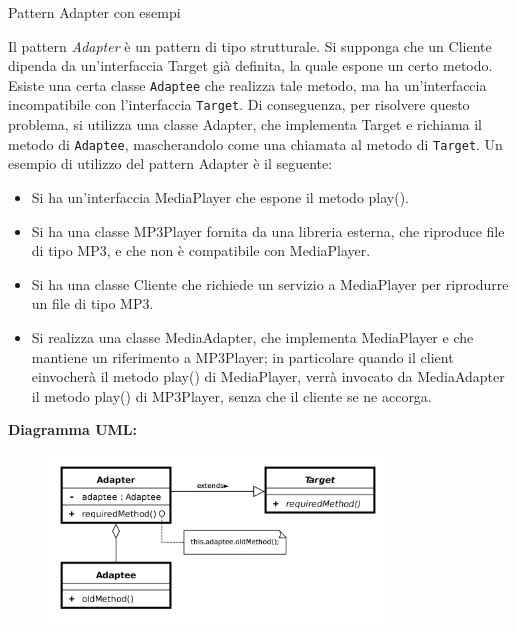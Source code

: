 \begin{problem}{1.20}
Pattern Adapter con esempi
\end{problem}
\begin{solution}
Il pattern \textit{Adapter} è un pattern di tipo strutturale.
Si supponga che un Cliente dipenda da un'interfaccia Target già definita, la quale espone un certo metodo.
Esiste una certa classe \texttt{Adaptee} che realizza tale metodo, ma ha un'interfaccia incompatibile con l'interfaccia \texttt{Target}.
Di conseguenza, per risolvere questo problema, si utilizza una classe Adapter, che implementa Target e richiama il metodo di \texttt{Adaptee}, mascherandolo come una chiamata al metodo di \texttt{Target}.
Un esempio di utilizzo del pattern Adapter è il seguente:
\begin{itemize}
	\item Si ha un'interfaccia MediaPlayer che espone il metodo play().
	\item Si ha una classe MP3Player fornita da una libreria esterna, che riproduce file di tipo MP3, e che non è compatibile con MediaPlayer.
	\item Si ha una classe Cliente che richiede un servizio a MediaPlayer per riprodurre un file di tipo MP3.
	\item Si realizza una classe MediaAdapter, che implementa MediaPlayer e che mantiene un riferimento a MP3Player; in particolare quando il client einvocherà il metodo play() di MediaPlayer, verrà invocato da MediaAdapter il metodo play() di MP3Player, senza che il cliente se ne accorga.
\end{itemize}
\textbf{Diagramma UML:}
\begin{figure}[htb!]
	\centering
	\includegraphics[width=9cm]{./immagini/adapterPattern.png}
\end{figure}
\end{solution}



